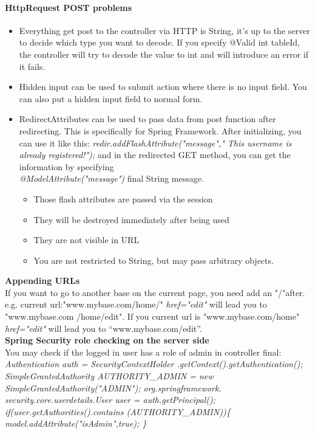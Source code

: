 \documentclass[12pt]{article}
\begin{document}
\paragraph{HttpRequest POST problems}
\begin{itemize}
	\item Everything get post to the controller via HTTP is String, it’s up to the server to decide which type you want to decode. If you specify @Valid int tableId, the controller will try to decode the value to int and will introduce an error if it fails.
	\item Hidden input can be used to submit action where there is no input field. You can also put a hidden input field to normal form.
	\item RedirectAttributes can be used to pass data from post function after redirecting. This is specifically for Spring Framework. After initializing, you can use it like this: \textit{redir.addFlashAttribute("message"," This username is already registered!");} and in the redirected GET method, you can get the information by specifying \\\textit{@ModelAttribute("message")} final String message.
	\begin{itemize}
		\item Those flash attributes are passed via the session 
		\item They will be destroyed immediately after being used
		\item They are not visible in URL
		\item You are not restricted to String, but may pass arbitrary objects.
	\end{itemize}
\end{itemize}
\textbf{Appending URLs}\\
If you want to go to another base on the current page, you need add an "/"after.
e.g. current url:"www.mybase.com/home/" \textit{href="edit"} will lead you to "www.mybase.com /home/edit". If you current url is "www.mybase.com/home" \textit{href="edit"} will lead you to “www.mybase.com/edit”.\\

\noindent\textbf{Spring Security role checking on the server side}\\
You may check if the logged in user has a role of admin in controller final:
\textit{Authentication auth = SecurityContextHolder .getContext().getAuthentication();
SimpleGrantedAuthority AUTHORITY\_ADMIN = new SimpleGrantedAuthority("ADMIN"); org.springframework. security.core.userdetails.User user = auth.getPrincipal(); if(user.getAuthorities().contains (AUTHORITY\_ADMIN))\{
	model.addAttribute("isAdmin",true);
\}}\\
\end{document}
